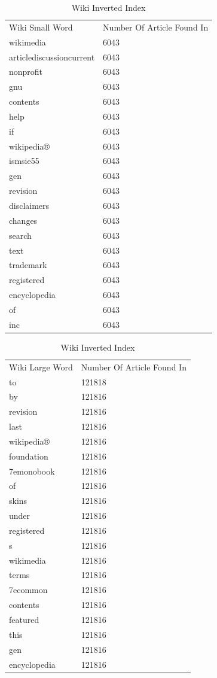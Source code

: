 \documentclass[11pt]{article}
\newenvironment{code}{\captionsetup{type=listing}}{}
\begin{document}
\begin{table}[H]
\centering
\caption{Wiki Inverted Index}
\label{tb:wii} 
\begin{tabular}{ll|}
Wiki Small Word & Number Of Article Found In \\
wikimedia & 6043 \\
articlediscussioncurrent & 6043 \\
nonprofit & 6043 \\
gnu & 6043 \\
contents & 6043 \\
help & 6043 \\
if & 6043 \\
wikipedia® & 6043 \\
ismsie55 & 6043 \\
gen & 6043 \\
revision & 6043 \\
disclaimers & 6043 \\
changes & 6043 \\
search & 6043 \\
text & 6043 \\
trademark & 6043 \\
registered & 6043 \\
encyclopedia & 6043 \\
of & 6043 \\
inc & 6043
\end{tabular}
 \begin{tabular}{ll}
Wiki Large Word & Number Of Article Found In \\
to & 121818 \\
by & 121816 \\
revision & 121816 \\
last & 121816 \\
wikipedia® & 121816 \\
foundation & 121816 \\
7emonobook & 121816 \\
of & 121816 \\
skins & 121816 \\
under & 121816 \\
registered & 121816 \\
s & 121816 \\
wikimedia & 121816 \\
terms & 121816 \\
7ecommon & 121816 \\
contents & 121816 \\
featured & 121816 \\
this & 121816 \\
gen & 121816 \\
encyclopedia & 121816
\end{tabular}
\end{table}
\newpage
\begin{code}
	 \label{code:iidx}
\end{code}
\newpage
\end{document}
